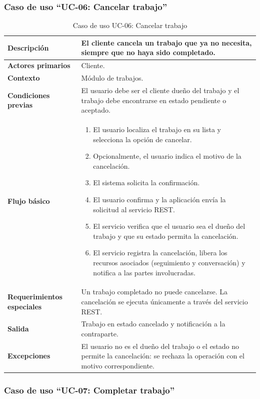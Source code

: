 \documentclass[doc,12pt,a4paper]{apa7}
\begin{document}
\subsubsection{Caso de uso ``UC-06: Cancelar trabajo''}

\begin{longtable}{|P{3.3cm}|L{11.2cm}|}
\caption{Caso de uso UC-06: Cancelar trabajo}\\
\hline
\textbf{Descripción} & El cliente cancela un trabajo que ya no necesita, siempre que no haya sido completado. \\ \hline
\textbf{Actores primarios} & Cliente. \\ \hline
\textbf{Contexto} & Módulo de trabajos. \\ \hline
\textbf{Condiciones previas} & El usuario debe ser el cliente dueño del trabajo y el trabajo debe encontrarse en estado pendiente o aceptado. \\ \hline
\textbf{Flujo básico} &
\begin{enumerate}
    \item El usuario localiza el trabajo en su lista y selecciona la opción de cancelar.
    \item Opcionalmente, el usuario indica el motivo de la cancelación.
    \item El sistema solicita la confirmación.
    \item El usuario confirma y la aplicación envía la solicitud al servicio REST.
    \item El servicio verifica que el usuario sea el dueño del trabajo y que su estado permita la cancelación.
    \item El servicio registra la cancelación, libera los recursos asociados (seguimiento y conversación) y notifica a las partes involucradas.
\end{enumerate} \\ \hline
\textbf{Requerimientos especiales} & Un trabajo completado no puede cancelarse. La cancelación se ejecuta únicamente a través del servicio REST. \\ \hline
\textbf{Salida} & Trabajo en estado cancelado y notificación a la contraparte. \\ \hline
\textbf{Excepciones} & El usuario no es el dueño del trabajo o el estado no permite la cancelación: se rechaza la operación con el motivo correspondiente. \\ \hline
\end{longtable}

\subsubsection{Caso de uso ``UC-07: Completar trabajo''}
\end{document}
